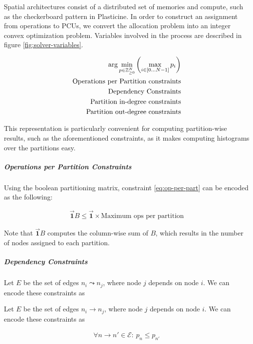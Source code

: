 Spatial architectures consist of a distributed set of memories and compute, such as the checkerboard pattern in Plasticine. In order to construct an assignment from operations to PCUs, we convert the allocation problem into an integer convex optimization problem. Variables involved in the process are described in figure \ref{fig:solver-variables}.

\begin{align}
    \arg \min_{p \in \mathbb{Z}_{\ge 0}^N} \left( \max_{i \in [0 ... N-1]}p_i \right) \label{eq:objective}\\
    \text{Operations per Partition constraints} \label{eq:op-per-part}\\
    \text{Dependency Constraints}\label{eq:dep-con}\\
    \text{Partition in-degree constraints}\label{eq:in-deg}\\
    \text{Partition out-degree constraints}\label{eq:out-deg}
\end{align}

This representation is particularly convenient for computing partition-wise results, such as the aforementioned constraints, as it makes computing histograms over the partitions easy.


\subparagraph{Operations per Partition Constraints}
Using the boolean partitioning matrix, constraint \ref{eq:op-per-part} can be encoded as the following:

\begin{align}
    \vec{\mathbf{1}} B \le \vec{\mathbf{1}} \times \text{Maximum ops per partition}
\end{align}

Note that $\vec{\mathbf{1}}B$ computes the column-wise sum of $B$, which results in the number of nodes assigned to each partition.

\subparagraph{Dependency Constraints}
Let $E$ be the set of edges $n_i \leadsto n_j$, where node $j$ depends on node $i$. We can encode these constraints as

\label{sec:dep-constraint}
Let $E$ be the set of edges $n_i \to n_j$, where node $j$ depends on node $i$. We can encode these constraints as

\begin{align}
    \forall n \to n' \in \mathcal{E}:\ p_{n} \le p_{n'}
\end{align}

